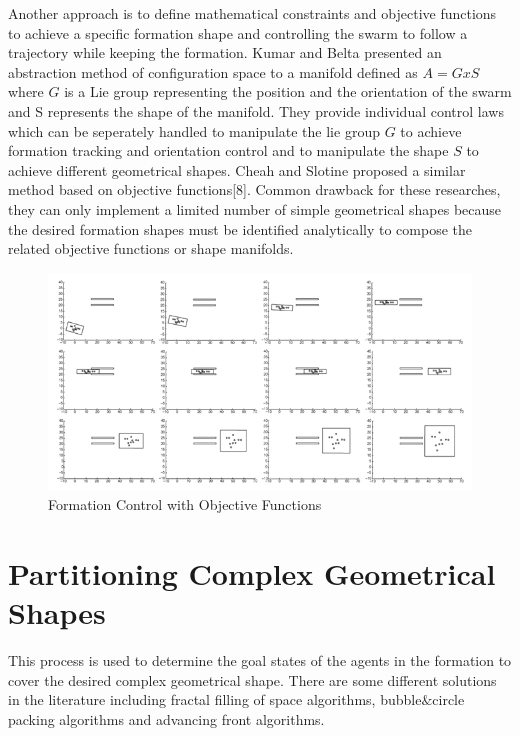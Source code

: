 Another approach is to define mathematical constraints and objective functions to achieve a specific formation shape and controlling the swarm to follow a trajectory while keeping the formation.  Kumar and Belta presented an abstraction method of configuration space to a manifold defined as $A  = G x S$ where $G$ is a Lie group representing the position and the orientation of the swarm  and S represents the shape of the manifold.  They provide individual control laws which can be seperately handled to manipulate the lie group $G$ to achieve formation tracking and orientation control and to manipulate the shape $S$ to achieve different geometrical shapes. Cheah and Slotine proposed a similar method based on objective functions[8].  Common drawback for these researches, they can only implement a limited number of simple geometrical shapes because the desired formation shapes must be identified analytically to compose the related objective functions or shape manifolds. 



\begin{figure}[H]
	\caption{Formation Control with Objective Functions}
	\centering
	\includegraphics[scale = 0.8]{manifold}
\end{figure}



\section{Partitioning Complex Geometrical Shapes}


This process is used to determine the goal states of the agents in the formation to cover the desired complex geometrical shape. There are some different solutions in the literature including fractal filling of space algorithms, bubble$\&$circle packing algorithms and advancing front algorithms. 

